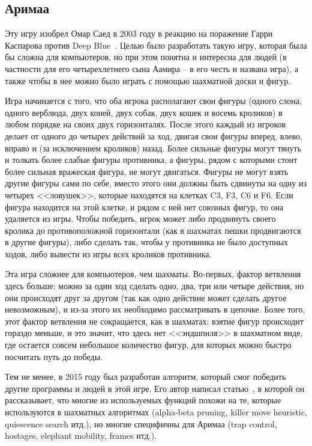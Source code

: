 \documentclass{article}
\begin{document}
\subsection{Аримаа}

Эту игру изобрел Омар Саед в 2003 году в реакцию на поражение Гарри Каспарова против Deep Blue~\cite{arimaa}.
Целью было разработать такую игру, которая была бы сложна для компьютеров,
но при этом понятна и интересна для людей (в частности для его четырехлетнего сына Аамира -- в его честь и названа игра),
а также чтобы в нее можно было играть с помощью шахматной доски и фигур.

Игра начинается с того, что оба игрока располагают свои фигуры (одного слона, одного верблюда, двух коней, двух собак, двух кошек и восемь кроликов)
в любом порядке на своих двух горизонталях.
После этого каждый из игроков делает от одного до четырех действий за ход,
двигая свои фигуры вперед, влево, вправо и (за исключением кроликов) назад.
Более сильные фигуры могут тянуть и толкать более слабые фигуры противника,
а фигуры, рядом с которыми стоит более сильная вражеская фигура, не могут двигаться.
Фигуры не могут взять другие фигуры сами по себе,
вместо этого они должны быть сдвинуты на одну из четырех <<ловушек>>,
которые находятся на клетках C3, F3, C6 и F6.
Если фигура находится на этой клетке, и рядом с ней нет союзных фигур,
то она удаляется из игры.
Чтобы победить, игрок может либо продвинуть своего кролика до противоположной горизонтали
(как в шахматах пешки продвигаются в другие фигуры),
либо сделать так, чтобы у противника не было доступных ходов,
либо вывести из игры всех кроликов противника.

Эта игра сложнее для компьютеров, чем шахматы.
Во-первых, фактор ветвления здесь больше:
можно за один ход сделать одно, два, три или четыре действия,
но они происходят друг за другом (так как одно действие может сделать другое невозможным),
и из-за этого их необходимо рассматривать в цепочке.
Более того, этот фактор ветвления не сокращается, как в шахматах:
взятие фигур происходит гораздо меньше,
и это значит, что здесь нет <<эндшпиля>> в шахматном виде,
где остается совсем небольшое количество фигур,
для которых можно быстро посчитать путь до победы.

Тем не менее, в 2015 году был разработан алгоритм, который смог победить другие программы
и людей в этой игре. Его автор написал статью~\cite{arimaa-program}, в которой
он рассказывает, что многие из используемых функций похожи на те,
которые используются в шахматных алгоритмах (alpha-beta pruning, killer move heuristic, quiescence search итд.),
но многие специфичны для Аримаа (trap control, hostages, elephant mobility, frames итд.).
\end{document}
